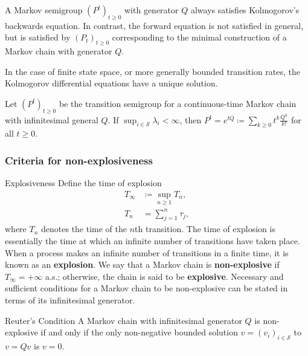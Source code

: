 \begin{rmk}{}{}
A Markov semigroup \((P^t)_{t \geq 0}\) with generator \(Q\) always satisfies Kolmogorov's backwards equation. In contrast, the forward equation is not satisfied in general, but is satisfied by \((P_t)_{t \geq 0}\) corresponding to the minimal construction of a Markov chain with generator \(Q\). 

In the case of finite state space, or more generally bounded transition
rates, the Kolmogorov differential equations have a unique solution.
\end{rmk}

\begin{cor}{}{}
Let \((P^t)_{t \geq 0}\) be the transition semigroup for a continuous-time Markov chain with infinitesimal general \(Q\). If \(\sup _{i \in  \mathcal{S} }\lambda _{i} < \infty  \), then \(P^t = e^{tQ}\coloneqq \sum_{k \geq 0}t^k \frac{Q^k}{k!}   \) for all \(t \geq 0 \). 
\end{cor}

\subsubsection{Criteria for non-explosiveness}

\begin{defn}{Explosiveness}{}
Define the time of explosion
\begin{align*}
    T_{ \infty }& \coloneqq \sup _{n \geq 1}T_{n}, \\
    T_{n} & = \sum_{j = 1}^n \tau _{j} ,
\end{align*}
where \(T_{n}   \) denotes the time of the \(n\)th transition. The time of explosion is essentially the time at which an infinite number of transitions have taken place. When a process makes an infinite number of transitions in a finite time, it is known as an \textbf{explosion}. We say that a Markov chain is \textbf{non-explosive} if \(T_ \infty  = + \infty \) a.s.; otherwise, the chain is said to be \textbf{explosive}. Necessary and sufficient conditions for a Markov chain to be non-explosive can be stated in terms of its infinitesimal generator.
\end{defn}

\begin{thrm}{Reuter's Condition}{}
A Markov chain with infinitesimal generator \(Q\) is non-explosive if and only if the only non-negative bounded solution \(v = (v_{i} )_{i \in  \mathcal{S} }\) to \(v = Qv\) is \(v = 0\). 
\end{thrm}

